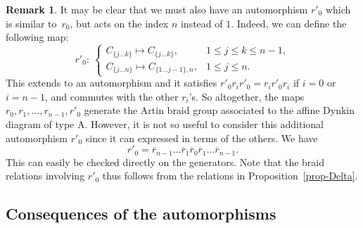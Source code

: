 \documentclass[pdftex]{sigma}
\numberwithin{equation}{section}
\theoremstyle{definition}
\newtheorem{rema}[theo]{Remark}
\newcommand{\rb}{\overline{r}}
\begin{document}
\begin{rema}
It may be clear that we must also have an automorphism $r'_0$ which is similar to~$r_0$, but acts on the index $n$ instead of $1$. Indeed, we can define the following map:
\[r'_0\colon \
\begin{cases}
C_{\{j\dots k\}}\mapsto C_{\{j\dots k\}} ,& 1\leq j\leq k\leq n-1, \\
C_{\{j\dots n\}}\mapsto C_{\{1\dots j-1\},n} ,& 1\leq j\leq n.
\end{cases}\]
This extends to an automorphism and it satisfies $r'_0r_ir'_0=r_ir'_0r_i$ if $i=0$ or $i=n-1$, and commutes with the other $r_i$'s. So altogether, the maps $r_0,r_1,\dots,r_{n-1},r'_0$ generate the Artin braid group associated to the affine Dynkin diagram of type A. However, it is not so useful to consider this additional automorphism $r'_0$ since it can expressed in terms of the others. We have
\[r'_0=\rb_{n-1}\dots \rb_1\rb_0\rb_1\dots \rb_{n-1} .\]
This can easily be checked directly on the generators. Note that the braid relations involving $r'_0$ thus follows from the relations in Proposition~\ref{prop-Delta}.
\end{rema}

\subsection{Consequences of the automorphisms}
\end{document}
